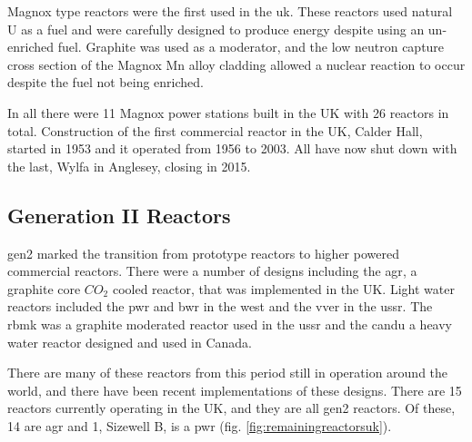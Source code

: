 Magnox type reactors were the first used in the \acrshort{uk}.  These reactors used natural U as a fuel and were carefully designed to produce energy despite using an un-enriched fuel.  Graphite was used as a moderator, and the low neutron capture cross section of the Magnox \Gls{Mn} alloy cladding allowed a nuclear reaction to occur despite the fuel not being enriched.

In all there were 11 Magnox power stations built in the UK with 26 reactors in total.  Construction of the first commercial reactor in the UK, Calder Hall, started in 1953 and it operated from 1956 to 2003.  All have now shut down with the last, Wylfa in Anglesey, closing in 2015.

\subsection{Generation II Reactors}

\acrshort{gen2} marked the transition from prototype reactors to higher powered commercial reactors.  There were a number of designs including the \acrshort{agr}, a graphite core $CO_2$ cooled reactor, that was implemented in the UK.  Light water reactors included the \acrshort{pwr} and \acrshort{bwr} in the west and the \acrshort{vver} in the \acrshort{ussr}.  The \acrshort{rbmk} was a graphite moderated reactor used in the \acrshort{ussr} and the \acrshort{candu} a heavy water reactor designed and used in Canada.

There are many of these reactors from this period still in operation around the world, and there have been recent implementations of these designs.  There are 15 reactors currently operating in the UK, and they are all \acrshort{gen2} reactors.  Of these, 14 are \acrshort{agr} and 1, Sizewell B, is a \acrshort{pwr} (fig. \ref{fig:remainingreactorsuk}).

